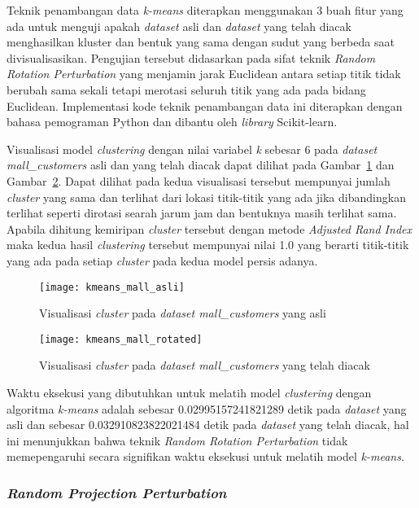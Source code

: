 Teknik penambangan data \textit{k-means} diterapkan menggunakan 3 buah fitur yang ada untuk menguji apakah \textit{dataset} asli dan \textit{dataset} yang telah diacak menghasilkan kluster dan bentuk yang sama dengan sudut yang berbeda saat divisualisasikan. Pengujian tersebut didasarkan pada sifat teknik \textit{Random Rotation Perturbation} yang menjamin jarak Euclidean antara setiap titik tidak berubah sama sekali tetapi merotasi seluruh titik yang ada pada bidang Euclidean. Implementasi kode teknik penambangan data ini diterapkan dengan bahasa pemograman Python dan dibantu oleh \textit{library} Scikit-learn.

Visualisasi model \textit{clustering} dengan nilai variabel \textit{k} sebesar 6 pada \textit{dataset} \textit{mall\_customers} asli dan yang telah diacak dapat dilihat pada Gambar~\ref{fig:kmeans_mall_asli} dan Gambar~\ref{fig:kmeans_mall_rotated}. Dapat dilihat pada kedua visualisasi tersebut mempunyai jumlah \textit{cluster} yang sama dan terlihat dari lokasi titik-titik yang ada jika dibandingkan terlihat seperti dirotasi searah jarum jam dan bentuknya masih terlihat sama. Apabila dihitung kemiripan \textit{cluster} tersebut dengan metode \textit{Adjusted Rand Index} maka kedua hasil \textit{clustering} tersebut mempunyai nilai 1.0 yang berarti titik-titik yang ada pada setiap \textit{cluster} pada kedua model persis adanya.

\begin{figure}
	\centering
	\texttt{[image: kmeans\_mall\_asli]}
	\caption{Visualisasi \textit{cluster} pada \textit{dataset mall\_customers} yang asli}
	\label{fig:kmeans_mall_asli}
\end{figure}

\begin{figure}
	\centering
	\texttt{[image: kmeans\_mall\_rotated]}
	\caption{Visualisasi \textit{cluster} pada \textit{dataset mall\_customers} yang telah diacak}
	\label{fig:kmeans_mall_rotated}
\end{figure}
	
Waktu eksekusi yang dibutuhkan untuk melatih model \textit{clustering} dengan algoritma \textit{k-means} adalah sebesar 0.02995157241821289 detik pada \textit{dataset} yang asli dan sebesar 0.032910823822021484 detik pada \textit{dataset} yang telah diacak, hal ini menunjukkan bahwa teknik \textit{Random Rotation Perturbation} tidak memepengaruhi secara signifikan waktu eksekusi untuk melatih model \textit{k-means}.

\subsubsection{\textit{Random Projection Perturbation}}
\label{subsubsec:pengujian-clustering-rpp}

